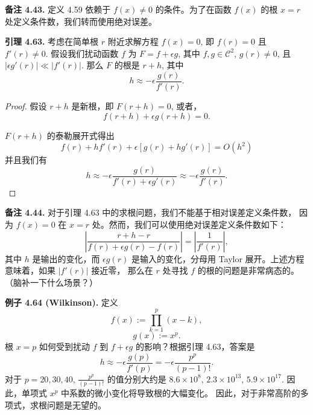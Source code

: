 \documentclass[a4paper]{ctexart}
\begin{document}
{%



\noindent \textbf{备注 4.43.} 定义 4.59 依赖于 $f(x) \neq 0$ 的条件。为了在函数 $f(x)$ 的根 $x = r$ 处定义条件数，我们转而使用绝对误差。

\noindent \textbf{引理 4.63.} 考虑在简单根 $r$ 附近求解方程 $f(x) = 0$, 即 $f(r) = 0$ 且 $f'(r) \neq 0$. 
假设我们扰动函数 $f$ 为 $F = f + \epsilon g$, 其中 $f, g \in \mathcal{C}^2$, 
$g(r) \neq 0$, 且 $|\epsilon g'(r)| \ll |f'(r)|$. 那么 $F$ 的根是 $r + h$, 其中
\[
  h \approx -\epsilon \frac{g(r)}{f'(r)}. \tag{4.32}
\]

\begin{proof}
假设 $r + h$ 是新根，即 $F(r + h) = 0$, 或者，
\[
  f(r + h) + \epsilon g(r + h) = 0.
\]

$F(r + h)$ 的泰勒展开式得出
\[
  f(r) + hf'(r) + \epsilon[g(r) + hg'(r)] = O(h^2)
\]
并且我们有
\[
  h \approx -\epsilon \frac{g(r)}{f'(r) + \epsilon g'(r)} \approx -\epsilon \frac{g(r)}{f'(r)}. 
\]
\end{proof}

\noindent \textbf{备注 4.44.} 对于引理 4.63 中的求根问题，我们不能基于相对误差定义条件数，
因为 $f(x) = 0$ 在 $x = r$ 处。然而，我们可以使用绝对误差定义条件数如下：
\[
  \left|\frac{r + h - r}{f(r) + \epsilon g(r) - f(r)}\right| = \left|\frac{1}{f'(r)}\right|,
\]
其中 $h$ 是输出的变化，而 $\epsilon g(r)$ 是输入的变化，分母用 Taylor 展开。上述方程意味着，如果 $|f'(r)|$ 接近零，
那么在 $r$ 处寻找 $f$ 的根的问题是非常病态的。（脑补一下什么场景？）

\noindent \textbf{例子 4.64 (Wilkinson).} 定义
\[
  f(x) := \prod_{k=1}^{p} (x - k),
\]
\[
  g(x) := x^p.
\]
根 $x = p$ 如何受到扰动 $f$ 到 $f + \epsilon g$ 的影响？根据引理 4.63，答案是
\[
  h \approx -\epsilon \frac{g(p)}{f'(p)} = -\epsilon \frac{p^p}{(p-1)!}.
\]
对于 $p = 20, 30, 40$, $\frac{p^p}{(p-1)!}$ 的值分别大约是 
$8.6 \times 10^8$, $2.3 \times 10^{13}$, $5.9 \times 10^{17}$. 
因此，单项式 $x^p$ 中系数的微小变化将导致根的大幅变化。
因此，对于非常高阶的多项式，求根问题是无望的。

}
\end{document}
